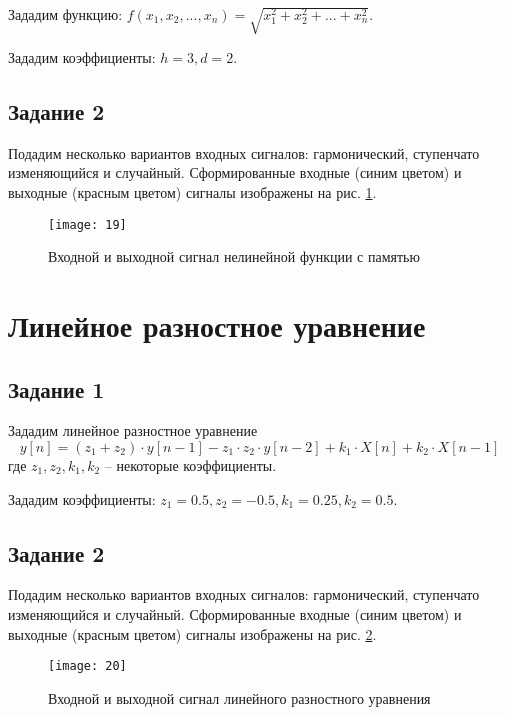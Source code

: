 Зададим функцию: $f(x_1, x_2,...,x_n) = \sqrt{x_1^2 + x_2^2 + ... + x_n^2}$.

Зададим коэффициенты: $h = 3, d = 2$.

\subsection{Задание 2}

Подадим несколько вариантов входных сигналов: гармонический, ступенчато изменяющийся и случайный. Сформированные входные (синим цветом) и выходные (красным цветом) сигналы изображены на рис. \ref{fig:non_linear_function}.

\begin{figure}[H]
\begin{center}
	\texttt{[image: 19]}
	\caption{Входной и выходной сигнал нелинейной функции с памятью}
	\label{fig:non_linear_function}
\end{center}
\end{figure}

\newpage

\section{Линейное разностное уравнение}

\subsection{Задание 1}

Зададим линейное разностное уравнение 
\begin{equation*}
y[n] = (z_1 + z_2) \cdot y[n-1] - z_1 \cdot z_2 \cdot y[n-2] + k_1 \cdot X[n] + k_2 \cdot X[n-1]
\end{equation*}
где $z_1, z_2, k_1, k_2$ – некоторые коэффициенты.

Зададим коэффициенты: $z_1 = 0.5, z_2 = -0.5, k_1 = 0.25, k_2 = 0.5$.

\subsection{Задание 2}

Подадим несколько вариантов входных сигналов: гармонический, ступенчато изменяющийся и случайный. Сформированные входные (синим цветом) и выходные (красным цветом) сигналы изображены на рис. \ref{fig:difference_equation}.

\begin{figure}[H]
\begin{center}
	\texttt{[image: 20]}
	\caption{Входной и выходной сигнал линейного разностного уравнения}
	\label{fig:difference_equation}
\end{center}
\end{figure}

